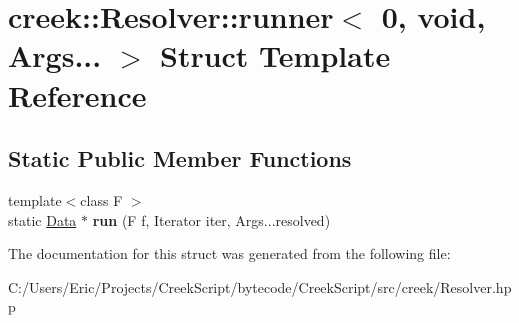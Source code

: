 \hypertarget{structcreek_1_1_resolver_1_1runner_3_010_00_01void_00_01_args_8_8_8_01_4}{}\section{creek\+:\+:Resolver\+:\+:runner$<$ 0, void, Args... $>$ Struct Template Reference}
\label{structcreek_1_1_resolver_1_1runner_3_010_00_01void_00_01_args_8_8_8_01_4}
\subsection*{Static Public Member Functions}
\begin{DoxyCompactItemize}
\item 
{\footnotesize template$<$class F $>$ }\\static \hyperlink{classcreek_1_1_data}{Data} $\ast$ {\bfseries run} (F f, Iterator iter, Args...\+resolved)\hypertarget{structcreek_1_1_resolver_1_1runner_3_010_00_01void_00_01_args_8_8_8_01_4_a4683f9b73198e28e8cc2c4b575255e77}{}\label{structcreek_1_1_resolver_1_1runner_3_010_00_01void_00_01_args_8_8_8_01_4_a4683f9b73198e28e8cc2c4b575255e77}

\end{DoxyCompactItemize}


The documentation for this struct was generated from the following file\+:\begin{DoxyCompactItemize}
\item 
C\+:/\+Users/\+Eric/\+Projects/\+Creek\+Script/bytecode/\+Creek\+Script/src/creek/Resolver.\+hpp\end{DoxyCompactItemize}
